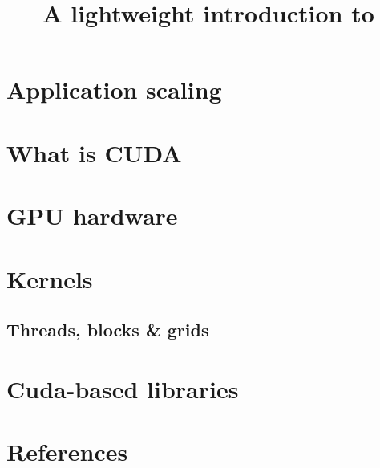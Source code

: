 \documentclass[
	final
]{beamer}
\title{A lightweight introduction to \cuda}
\author{
	
}
\begin{document}
{

\begin{frame}

	\maketitle
\end{frame}
}

%	

\section{Application scaling}
	

\section{What is CUDA}
	

\section{GPU hardware}
	
	
%	

\section{Kernels}
	
	\subsection{Threads, blocks \& grids}
	

\section{Cuda-based libraries}
	

\section{References}
	
\end{document}
